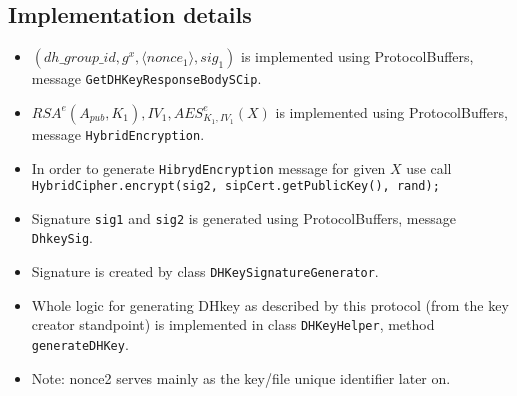 \documentclass[a4paper,10pt]{article}
\begin{document}
\subsection{Implementation details}
\begin{itemize}
 \item $(dh\_group\_id, g^x, \langle nonce_1\rangle, sig_1)$ is implemented using ProtocolBuffers, message \texttt{GetDHKeyResponseBodySCip}.
 \item $RSA^e(A_{pub}, K_1), IV_1, AES^e_{K_1, IV_1}(X)$ is implemented using ProtocolBuffers, message \texttt{HybridEncryption}.
 \item In order to generate \texttt{HibrydEncryption} message for given $X$ use call \\ \texttt{HybridCipher.encrypt(sig2, sipCert.getPublicKey(), rand);} 
 \item Signature \texttt{sig1} and \texttt{sig2} is generated using ProtocolBuffers, message \texttt{DhkeySig}.
 \item Signature is created by class \texttt{DHKeySignatureGenerator}.
 \item Whole logic for generating DHkey as described by this protocol (from the key creator standpoint) is implemented in class \texttt{DHKeyHelper}, method \texttt{generateDHKey}.
 \item Note: nonce2 serves mainly as the key/file unique identifier later on.
\end{itemize}
\end{document}
